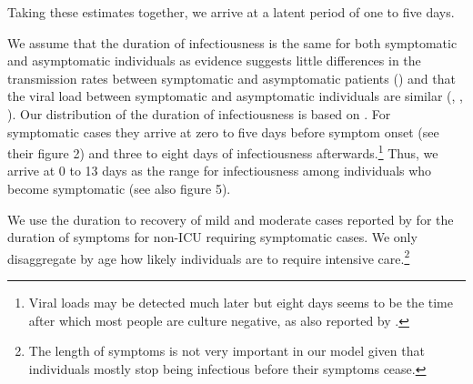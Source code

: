 Taking these estimates together, we arrive at a latent period of one to five days.


We assume that the duration of infectiousness is the same for both symptomatic and
asymptomatic individuals as evidence suggests little differences in the transmission
rates between symptomatic and asymptomatic patients (\citet{Yin2020}) and that the viral
load between symptomatic and asymptomatic individuals are similar (\citet{Zou2020},
\citet{Byrne2020}, \citet{Singanayagam2020}). Our distribution of the duration of
infectiousness is based on \citet{Byrne2020}. For symptomatic cases they arrive at zero
to five days before symptom onset (see their figure 2) and three to eight days of
infectiousness afterwards.\footnote{Viral loads may be detected much later but eight days
seems to be the time after which most people are culture negative, as also reported by
\citet{Singanayagam2020}.} Thus, we arrive at 0 to 13 days as the range for
infectiousness among individuals who become symptomatic (see also figure 5).


We use the duration to recovery of mild and moderate cases reported by \cite[Figure~S3,
Panel~2]{Bi2020} for the duration of symptoms for non-ICU requiring symptomatic cases. We
only disaggregate by age how likely individuals are to require intensive
care.\footnote{The length of symptoms is not very important in our model given that
individuals mostly stop being infectious before their symptoms cease.}


